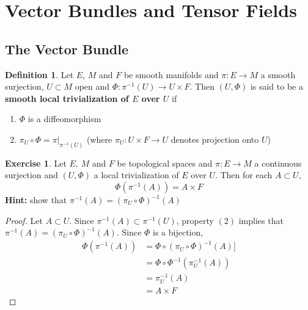 \documentclass[12pt]{amsart}
\theoremstyle{definition}
\newtheorem{defn}[definition]{Definition}
\newtheorem{ex}[definition]{Exercise}
\begin{document}
	
	
	
	
	
	
	
	

	
	\newpage
	\section{Vector Bundles and Tensor Fields}
	
	\subsection{The Vector Bundle}
	
	\begin{defn}
		Let $E$, $M$ and $F$ be smooth manifolds and $\pi: E \rightarrow M$ a smooth surjection, $U \subset M$ open and $\Phi: \pi^{-1}(U) \rightarrow U \times F$. Then $(U, \Phi)$ is said to be a \textbf{smooth local trivialization of $E$ over $U$}  if 
		\begin{enumerate}
			\item $\Phi$ is a diffeomorphism
			\item $\pi_U \circ \Phi = \pi|_{\pi^{-1}(U)}$ (where $\pi_U: U \times F \rightarrow U$ denotes projection onto $U$)
		\end{enumerate}
	\end{defn}

	\begin{ex}
		Let $E$, $M$ and $F$ be topological spaces and $\pi: E \rightarrow M$ a continuous surjection and $(U, \Phi)$ a local trivialization of $E$ over $U$. Then for each $A \subset U$, $$\Phi ( \pi^{-1}(A)) = A \times F$$
		\textbf{Hint:} show that $\pi^{-1}(A) = (\pi_U \circ \Phi)^{-1}(A)$
	\end{ex}
	
	\begin{proof}
		Let $A \subset U$. Since $ \pi^{-1}(A) \subset \pi^{-1}(U)$, property $(2)$ implies that $\pi^{-1}(A) = (\pi_U \circ \Phi)^{-1}(A)$. Since $\Phi$ is a bijection, 
		\begin{align*}
			\Phi (\pi^{-1}(A))
			&= \Phi \circ (\pi_U \circ \Phi)^{-1}(A)] \\
			&= \Phi \circ {\Phi}^{-1} (\pi_U^{-1}(A)) \\
			&= \pi_U^{-1}(A) \\
			&= A \times F
		\end{align*}
	\end{proof}
\end{document}
